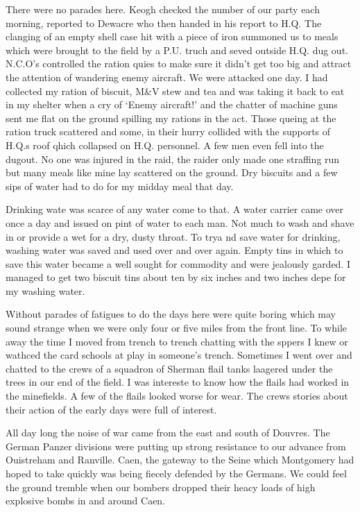 There were no parades here. \Corporal Keogh checked the number of our
party each morning, reported to \lieutenant Dewacre who then handed in his
report to H.Q. The clanging of an empty shell case hit with a piece of
iron summoned us to meals which were brought to the field by a
P.U. truch and seved outside H.Q. dug out. N.C.O's controlled the
ration quies to make sure it didn't get too big and attract the
attention of wandering enemy aircraft. We were attacked one day. I had
collected my ration of biscuit, M\&V stew and tea and was taking it
back to eat in my shelter when a cry of `Enemy aircraft!' and the
chatter of machine guns sent me flat on the ground spilling my rations
in the act. Those queing at the ration truck scattered and some, in
their hurry collided with the supports of H.Q.s roof qhich collapsed
on H.Q. personnel. A few men even fell into the dugout. No one was
injured in the raid, the raider only made one straffing run but many
meals like mine lay scattered on the ground. Dry biscuits and a few
sips of water had to do for my midday meal that day.

Drinking wate was scarce of any water come to that. A water carrier
came over once a day and issued on pint of water to each man. Not much
to wash and shave in or provide a wet for a dry, dusty throat. To trya
nd save water for drinking, washing water was saved and used over and
over again. Empty tins in which to save this water became a well
sought for commodity and were jealously garded. I managed to get two
biscuit tins about ten by six inches and two inches depe for my
washing water.

Without parades of fatigues to do the days here were quite boring
which may sound strange when we were only four or five miles from the
front line. To while away the time I moved from trench to trench
chatting with the sppers I knew or wathced the card schools at play in
someone's trench. Sometimes I went over and chatted to the crews of a
squadron of Sherman flail tanks laagered under the trees in our end of
the field. I was intereste to know how the flails had worked in the
minefields. A few of the flails looked worse for wear. The crews
stories about their action of the early days were full of interest.

All day long the noise of war came from the east and south of
Douvres. The German Panzer divisions were putting up strong resistance
to our advance from Ouistreham and Ranville. Caen, the gateway to the
Seine which Montgomery had hoped to take quickly was being fiecely
defended by the Germans. We could feel the ground tremble when our
bombers dropped their heacy loads of high explosive bombs in and
around Caen.

